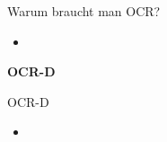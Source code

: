 \documentclass{bbawslides}
\begin{document}
\begin{bbawslide}{Warum braucht man OCR?}
  \vspace*{7mm}%
  \centerslidestrue%
  \begin{itemize}
    \item
  \end{itemize}
\end{bbawslide}

\begin{bbawpart}{\Large\bf OCR-D}
\end{bbawpart}

\begin{bbawslide}{OCR-D}
  \vspace*{7mm}%
  \centerslidestrue%
  \begin{itemize}
    \item
  \end{itemize}
\end{bbawslide}
\end{document}
